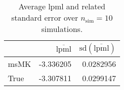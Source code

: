 \begin{table}[H]

\caption{Average lpml and related standard error over $n_{\text{sim}} = 10$ simulations.}
\centering
\begin{tabular}[t]{lrr}
\toprule
  & $\overbar{\text{lpml}}$ & $\text{sd}(\overbar{\text{lpml}})$\\
\midrule
msMK & -3.336205 & 0.0282956\\
True & -3.307811 & 0.0299147\\
\bottomrule
\end{tabular}
\end{table}